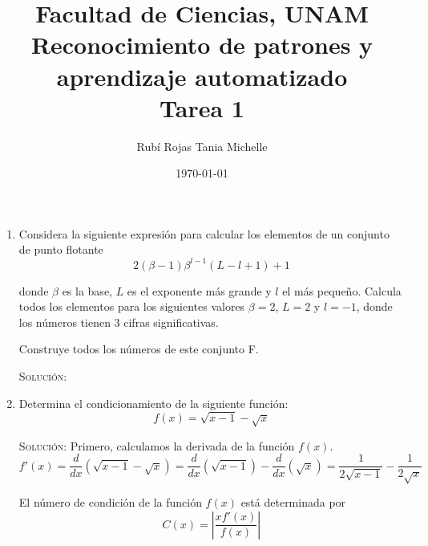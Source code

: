 \documentclass[letterpaper,11pt]{article}
\title{Facultad de Ciencias, UNAM \\ 
       Reconocimiento de patrones y aprendizaje automatizado \\ 
       Tarea 1}
\author{Rubí Rojas Tania Michelle}
\date{\today}
\begin{document}
\maketitle

\begin{enumerate}
    \item Considera la siguiente expresión para calcular los elementos de un 
    conjunto de punto flotante 
    \begin{equation*}
        2(\beta - 1) \beta^{l-1} (L - l + 1) + 1
    \end{equation*}

    donde $\beta$ es la base, $L$ es el exponente más grande y $l$ el más 
    pequeño. Calcula todos los elementos para los siguientes valores 
    $\beta = 2$, $L = 2$ y $l = -1$, donde los números tienen $3$ cifras 
    significativas.

    Construye todos los números de este conjunto F.

    \textsc{Solución:}
    
    \item Determina el condicionamiento de la siguiente función:
    \begin{equation*}
        f(x) = \sqrt{x - 1} - \sqrt{x}
    \end{equation*}

    \textsc{Solución:} Primero, calculamos la derivada de la función $f(x)$.
    \begin{equation*}
        f'(x) 
        = \frac{d}{dx} (\sqrt{x - 1} - \sqrt{x}) 
        = \frac{d}{dx} (\sqrt{x - 1}) - \frac{d}{dx} (\sqrt{x}) 
        = \frac{1}{2 \sqrt{x - 1}} - \frac{1}{2 \sqrt{x}} 
    \end{equation*}

    El número de condición de la función $f(x)$ está determinada por 
    \begin{equation*}
        C(x) = \left| \frac{x f'(x)}{f(x)} \right|
    \end{equation*}


\end{enumerate}
\end{document}
